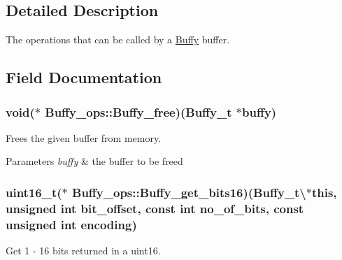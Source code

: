 \subsection{Detailed Description}
The operations that can be called by a \hyperlink{struct_buffy}{Buffy} buffer. 

\subsection{Field Documentation}
\hypertarget{struct_buffy__ops_a1bf805e996d3880005be3da20e718b1a}{
\subsubsection[{Buffy\-\_\-free}]{\setlength{\rightskip}{0pt plus 5cm}void($\ast$ Buffy\-\_\-ops\-::\-Buffy\-\_\-free)(Buffy\-\_\-t $\ast$buffy)}}\label{struct_buffy__ops_a1bf805e996d3880005be3da20e718b1a}


Frees the given buffer from memory. 


\begin{DoxyParams}{Parameters}
{\em buffy} & the buffer to be freed \\
\hline
\end{DoxyParams}
\hypertarget{struct_buffy__ops_a342ee8fffa1a034b236773573fc691c8}{
\subsubsection[{Buffy\-\_\-get\-\_\-bits16}]{\setlength{\rightskip}{0pt plus 5cm}uint16\-\_\-t($\ast$ Buffy\-\_\-ops\-::\-Buffy\-\_\-get\-\_\-bits16)(Buffy\-\_\-t\textbackslash{}$\ast$this, unsigned int bit\-\_\-offset, const int no\-\_\-of\-\_\-bits, const unsigned int encoding)}}\label{struct_buffy__ops_a342ee8fffa1a034b236773573fc691c8}


Get 1 -\/ 16 bits returned in a uint16. 



